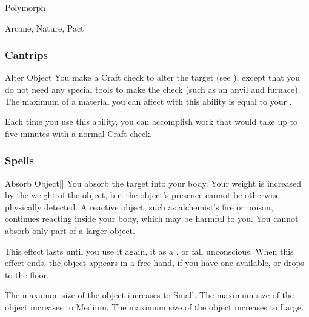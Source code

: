 \newpage
\begin{spellsection}{Polymorph}

\begin{spellheader}
\end{spellheader}


 Arcane, Nature, Pact

\subsubsection{Cantrips}


\begin{freeability}{Alter Object}
You make a Craft check to alter the target (see ), except that you do not need any special tools to make the check (such as an anvil and furnace).
The maximum  of a material you can affect with this ability is equal to your .

Each time you use this ability, you can accomplish work that would take up to five minutes with a normal Craft check.
\end{freeability}

\end{spellsection}


\subsubsection{Spells}


\lowercase{\hypertarget{spell:Absorb Object}{}}\label{spell:Absorb Object}
\begin{freeability}[Rank 1]{\hypertarget{spell:Absorb Object}{Absorb Object}}[]
You absorb the target into your body.
Your weight is increased by the weight of the object, but the object's presence cannot be otherwise physically detected.
A reactive object, such as alchemist's fire or poison, continues reacting inside your body, which may be harmful to you.
You cannot absorb only part of a larger object.

This effect lasts until you use it again,  it as a , or fall unconscious.
When this effect ends, the object appears in a free hand, if you have one available, or drops to the floor.

\rankline
{} The maximum size of the object increases to Small.
 The maximum size of the object increases to Medium.
 The maximum size of the object increases to Large.
\end{freeability}
\vspace{0.25em}



